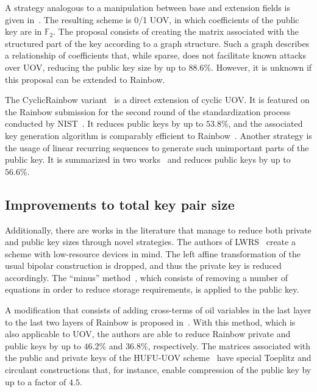 \documentclass[12pt, a4paper, oneside]{memoir}
\theoremstyle{definition}
\begin{document}
A strategy analogous to a manipulation between base and extension fields is given in~\cite{Petzoldt:201109}. The resulting scheme is 0/1 UOV, in which coefficients of the public key are in $\mathbb{F}_{2}$. The proposal consists of creating the matrix associated with the structured part of the key according to a graph structure. Such a graph describes a relationship of coefficients that, while sparse, does not facilitate known attacks over UOV, reducing the public key size by up to $88.6\%$. However, it is unknown if this proposal can be extended to Rainbow.

The CyclicRainbow variant~\cite{Petzoldt:201012} is a direct extension of cyclic UOV. It is featured on the Rainbow submission for the second round of the standardization process conducted by NIST~\cite{Ding:201901}. It reduces public keys by up to $53.8\%$, and the associated key generation algorithm is comparably efficient to Rainbow~\cite{Petzoldt:202004}. Another strategy is the usage of linear recurring sequences to generate such unimportant parts of the public key. It is summarized in two works~\cite{Petzoldt:201103,Petzoldt:201211} and reduces public keys by up to $56.6\%$.

\subsection{Improvements to total key pair size}\label{subsec:both}

Additionally, there are works in the literature that manage to reduce both private and public key sizes through novel strategies. The authors of LWRS~\cite{Zhang:201208} create a scheme with low-resource devices in mind. The left affine transformation of the usual bipolar construction is dropped, and thus the private key is reduced accordingly. The ``minus'' method~\cite[Sec.~3.2.1]{Wolf:200511}, which consists of removing a number of equations in order to reduce storage requirements, is applied to the public key.

A modification that consists of adding cross-terms of oil variables in the last layer to the last two layers of Rainbow is proposed in~\cite{Tan:201603}. With this method, which is also applicable to UOV, the authors are able to reduce Rainbow private and public keys by up to $46.2\%$ and $36.8\%$, respectively. The matrices associated with the public and private keys of the HUFU-UOV scheme~\cite{Tao:201905} have special Toeplitz and circulant constructions that, for instance, enable compression of the public key by up to a factor of $4.5$.
\end{document}
